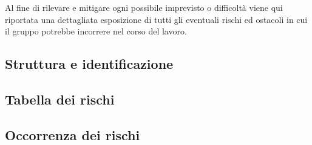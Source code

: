 Al fine di rilevare e mitigare ogni possibile imprevisto o difficoltà viene qui riportata una dettagliata esposizione di tutti gli eventuali rischi ed ostacoli in cui il gruppo \Gruppo{} potrebbe incorrere nel corso del lavoro.

\subsection{Struttura e identificazione}\label{sec:StrutturaRischi}


\subsection{Tabella dei rischi}\label{sec:TabellaRischi}


\subsection{Occorrenza dei rischi}\label{sec:OccorrenzaRischi}
